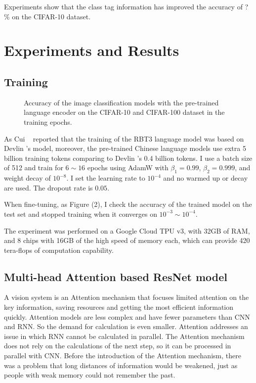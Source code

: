 \documentclass[10pt,twocolumn,letterpaper]{article}
\begin{document}
Experiments show that the class tag information has improved the accuracy of ?\% on the CIFAR-10 dataset.


\section{Experiments and Results}


\subsection{Training}

\begin{figure*}
\begin{center}
\end{center}
   \caption{Accuracy of the image classification models with the pre-trained language encoder on the CIFAR-10 and CIFAR-100 dataset in the training epochs.}
\label{fig:short}
\end{figure*}


As Cui \etal~\cite{cui2020revisiting} reported that the training of the RBT3 language model was based on Devlin \etal's model,
moreover, the pre-trained Chinese language models use extra 5 billion training tokens comparing to Devlin \etal's 0.4 billion tokens.
I use a batch size of 512 and train for $6\sim16$ epochs using AdamW with $\beta_1=0.99$, $\beta_2=0.999$, and weight decay of $10^{-8}$.
I set the learning rate to $10^{-4}$ and no warmed up or decay are used.
The dropout rate is $0.05$.

\par When fine-tuning, as Figure (2), I check the accuracy of the trained model on the test set and stopped training when it converges on $10^{-3}\sim10^{-4}$.

\par The experiment was performed on a Google Cloud TPU v3, with 32GB of RAM, and 8 chips with 16GB of the high speed of memory each,
which can provide 420 tera-flops of computation capability.

\subsection{Multi-head Attention based ResNet model}

A vision system is an Attention mechanism that focuses limited attention on the key information, saving resources and getting the most efficient information quickly.
Attention models are less complex and have fewer parameters than CNN and RNN. So the demand for calculation is even smaller.
Attention addresses an issue in which RNN cannot be calculated in parallel.
The Attention mechanism does not rely on the calculations of the next step, so it can be processed in parallel with CNN.
Before the introduction of the Attention mechanism, there was a problem that long distances of information would be weakened,
just as people with weak memory could not remember the past.
\end{document}
